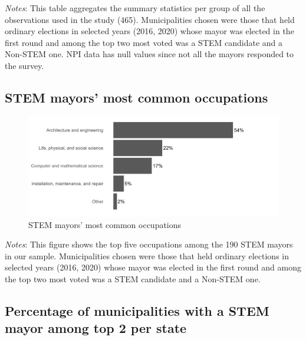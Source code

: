 \documentclass[
  letterpaper,
  DIV=11,
  numbers=noendperiod]{scrartcl}
\begin{document}
\emph{Notes}: This table aggregates the summary statistics per group of
all the observations used in the study (465). Municipalities chosen were
those that held ordinary elections in selected years (2016, 2020) whose
mayor was elected in the first round and among the top two most voted
was a STEM candidate and a Non-STEM one. NPI data has null values since
not all the mayors responded to the survey.

\subsection{STEM mayors' most common
occupations}\label{stem-mayors-most-common-occupations}

\begin{figure}[H]

\caption{STEM mayors' most common occupations}

{\centering \includegraphics{outputs/figures/barplot_stem_cbos_stem_ocupacao.png}

}

\end{figure}%

\emph{Notes}: This figure shows the top five occupations among the 190
STEM mayors in our sample. Municipalities chosen were those that held
ordinary elections in selected years (2016, 2020) whose mayor was
elected in the first round and among the top two most voted was a STEM
candidate and a Non-STEM one.

\subsection{Percentage of municipalities with a STEM mayor among top 2
per
state}\label{percentage-of-municipalities-with-a-stem-mayor-among-top-2-per-state}
\end{document}
